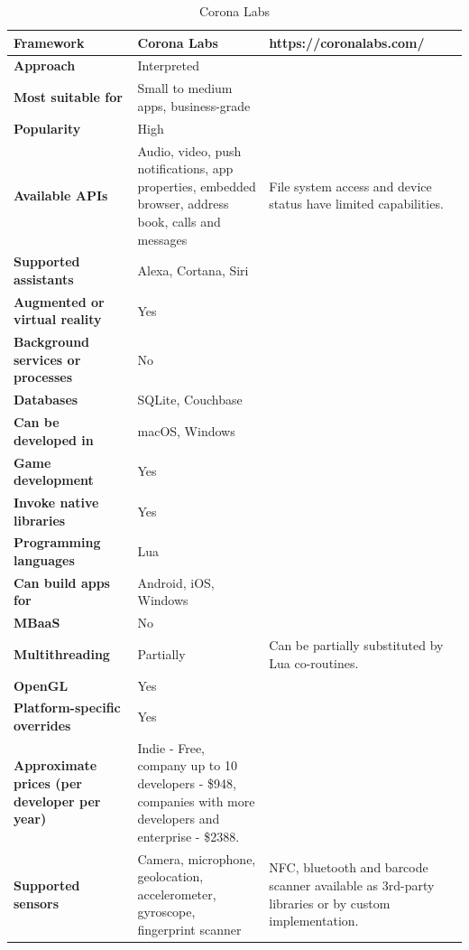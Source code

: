 \documentclass[english,master,public,dept460,male,cpdeclaration,oneside]{diploma}
\begin{document}
\begin{table}[!h]
	\centering
	\caption{Corona Labs}
	\begin{tabular}{p{} | p{} | p{}}
		\toprule		
		\textbf{Framework} & \textbf{Corona Labs} & https://coronalabs.com/ \\
		\midrule
		\textbf{Approach} & Interpreted & \\			
		\midrule	
		\textbf{Most suitable for} & Small to medium apps, business-grade & \\
		\midrule
		\textbf{Popularity} & High & \\			
		\midrule
		\textbf{Available APIs} & Audio, video, push notifications, app properties, embedded browser, address book, calls and messages & File system access and device status have limited capabilities. \\			
		\midrule
		\textbf{Supported assistants} & Alexa, Cortana, Siri & \\			
		\midrule
		\textbf{Augmented or virtual reality} & Yes & \\			
		\midrule
		\textbf{Background services or processes} & No & \\			
		\midrule
		\textbf{Databases} & SQLite, Couchbase & \\			
		\midrule
		\textbf{Can be developed in} & macOS, Windows &  \\			
		\midrule
		\textbf{Game development} & Yes & \\			
		\midrule
		\textbf{Invoke native libraries} & Yes & \\			
		\midrule
		\textbf{Programming languages} & Lua & \\			
		\midrule
		\textbf{Can build apps for} & Android, iOS, Windows & \\			
		\midrule
		\textbf{MBaaS} & No & \\			
		\midrule
		\textbf{Multithreading} & Partially & Can be partially substituted by Lua co-routines. \\			
		\midrule
		\textbf{OpenGL} & Yes & \\			
		\midrule
		\textbf{Platform-specific overrides} & Yes & \\			
		\midrule
		\textbf{Approximate prices (per developer per year)} & Indie - Free, company up to 10 developers - \$948, companies with more developers and enterprise - \$2388. &  \\			
		\midrule
		\textbf{Supported sensors} & Camera, microphone, geolocation, accelerometer, gyroscope, fingerprint scanner & NFC, bluetooth and barcode scanner available as 3rd-party libraries or by custom implementation. \\			
		\midrule
	\end{tabular}
\end{table}
\end{document}
